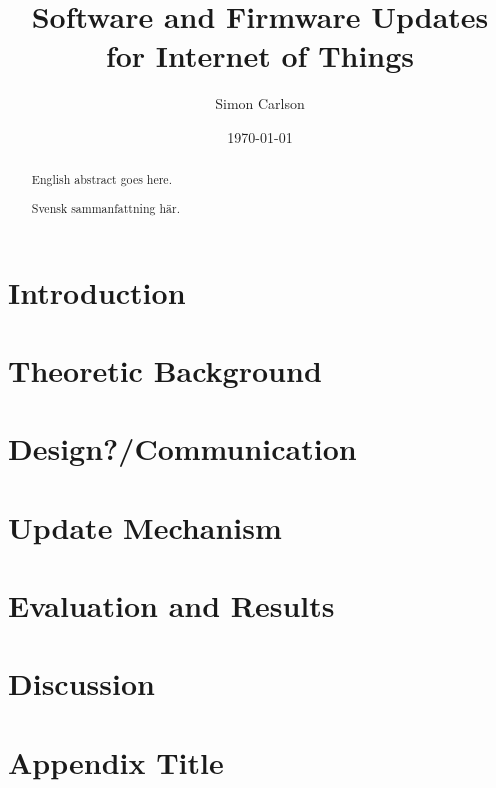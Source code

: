 \documentclass{kththesis}
\title{Software and Firmware Updates for Internet of Things}
\author{Simon Carlson}
\date{\today}
\begin{document}
\frontmatter

\titlepage

\begin{abstract}
  English abstract goes here.

  
\end{abstract}


\begin{otherlanguage}{swedish}
  \begin{abstract}
    Svensk sammanfattning här.
  \end{abstract}
\end{otherlanguage}


\tableofcontents


\mainmatter


\chapter{Introduction}



\chapter{Theoretic Background}


\chapter{Design?/Communication}

\chapter{Update Mechanism}

\chapter{Evaluation and Results}

\chapter{Discussion}




\printbibliography[heading=bibintoc] %

\appendix

\chapter{Appendix Title}
\end{document}
